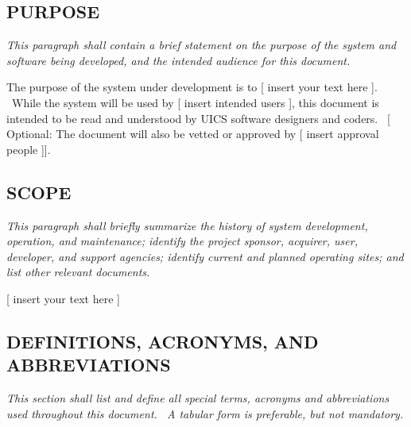 \documentclass[twoside,letterpaper]{article}
\begin{document}
\subsection[PURPOSE]{\rmfamily\bfseries\color{black}
PURPOSE}
{\itshape\color{black}
This paragraph shall contain a brief statement on the purpose of the
system and software being developed, and the intended audience for this
document.}

{\color{black}
The purpose of the system under development is to [ insert your text
here ]. \ While the system will be used by [ insert intended users ],
this document is intended to be read and understood by UICS software
designers and coders. \ [ Optional: The document will also be vetted or
approved by [ insert approval people ]].}

\subsection[SCOPE]{\rmfamily\bfseries\color{black}
SCOPE}
{\itshape\color{black}
This paragraph shall briefly summarize the history of system
development, operation, and maintenance; identify the project sponsor,
acquirer, user, developer, and support agencies; identify current and
planned operating sites; and list other relevant documents.}

{\color{black}
[ insert your text here ]}

\subsection[DEFINITIONS, ACRONYMS, AND
ABBREVIATIONS]{\rmfamily\bfseries\color{black}
DEFINITIONS, ACRONYMS, AND ABBREVIATIONS}
{\itshape\color{black}
This section shall list and define all special terms, acronyms and
abbreviations used throughout this document. \ A tabular form is
preferable, but not mandatory.}


\bigskip
\end{document}

